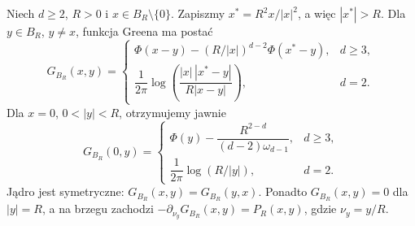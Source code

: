 \begin{lemat}
\label{lem:pde14-green-ball}
Niech $d\ge2$, $R>0$ i $x\in B_R\setminus\{0\}$.
Zapiszmy $x^*=R^2x/|x|^2$, a więc $|x^*|>R$. Dla
$y\in B_R$, $y\ne x$, funkcja Greena ma postać
\[
 G_{B_R}(x,y)=\begin{cases}
 \Phi(x-y)-(R/|x|)^{d-2}\Phi(x^*-y),&d\ge3,\\[3pt]
 \dfrac1{2\pi}\log\left(\dfrac{|x|\,|x^*-y|}
 {R|x-y|}\right),&d=2.
 \end{cases}
\]
Dla $x=0$, $0<|y|<R$, otrzymujemy jawnie
\[
 G_{B_R}(0,y)=\begin{cases}
 \Phi(y)-\dfrac{R^{2-d}}{(d-2)\omega_{d-1}},&d\ge3,\\[3pt]
 \dfrac1{2\pi}\log(R/|y|),&d=2.
 \end{cases}
\]
Jądro jest
symetryczne: $G_{B_R}(x,y)=G_{B_R}(y,x)$. Ponadto
$G_{B_R}(x,y)=0$ dla $|y|=R$, a na brzegu zachodzi
$-\partial_{\nu_y}G_{B_R}(x,y)=P_R(x,y)$, gdzie
$\nu_y=y/R$.
\end{lemat}
